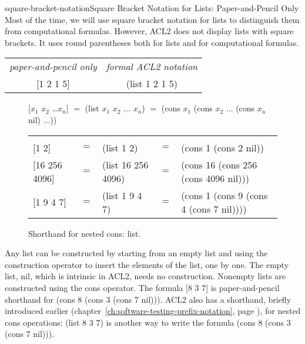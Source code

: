\begin{aside}{square-bracket-notation}{Square Bracket Notation for Lists: Paper-and-Pencil Only}
Most of the time, we will use square bracket
notation for lists
to distinguish them from computational formulas.
However, ACL2 does not display lists with square brackets.
It uses round parentheses both for lists and for computational formulas.
\begin{center}
\begin{tabular}{cc}
 \emph{paper-and-pencil only} & \emph{formal ACL2 notation}\\
 \textsf{[1 2 1 5]}           & \textsf{(list 1 2 1 5)}\\
\end{tabular}
\end{center}
\end{aside}

\begin{figure}
\begin{center}
\textsf{[$x_1$ $x_2$ \dots $x_n$]} $=$
\textsf{(list $x_1$ $x_2$ $\dots$ $x_n$)} $=$ \textsf{(cons $x_1$ (cons $x_2$ $\dots$ (cons $x_n$ nil) $\dots$))}\\
\addtolength{\tabcolsep}{-4pt}
\begin{tabular}{lclcl}
\hline \\[-1.0em]
\textsf{{[1 2]}}         &$=$ &\textsf{(list 1 2)}        &$=$ &\textsf{(cons 1 (cons 2 nil))}\\
\textsf{{[16 256 4096]}} &$=$ &\textsf{(list 16 256 4096})&$=$ &\textsf{(cons 16 (cons 256 (cons 4096 nil)))}\\
\textsf{{[1 9 4 7]}}     &$=$ &\textsf{(list 1 9 4 7)}    &$=$ &\textsf{(cons 1 (cons 9 (cons 4 (cons 7 nil))))}\\
\end{tabular}
\addtolength{\tabcolsep}{4pt}
\end{center}
\caption{Shorthand for nested \textsf{cons}: \textsf{list}.}
\label{fig:list-nested-cons}
\end{figure}

Any list can be constructed by starting from an empty list
and using the construction operator to insert the elements of the list, one by one.
The empty list, \textsf{nil}, which is intrinsic in ACL2, needs no construction.
Nonempty lists are constructed using the \textsf{cons} operator.
The formula \textsf{[8 3 7]} is paper-and-pencil shorthand
for \textsf{(cons 8 (cons 3 (cons 7 nil)))}.
ACL2 also has a shorthand, briefly introduced earlier
(chapter~\ref{ch:software-testing-prefix-notation}, page \pageref{list-op-informal}),
for nested \textsf{cons} operations: \textsf{(list 8 3 7)} is another way to write the formula
\textsf{(cons 8 (cons 3 (cons 7 nil)))}.

